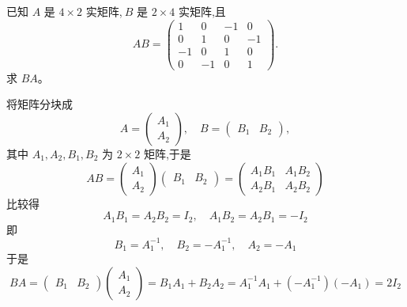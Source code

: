 \begin{questions}
    \question 已知 $A$ 是 $4 \times 2$ 实矩阵,$\ B$ 是 $2 \times 4$ 实矩阵,且
    \[
    AB = \begin{pmatrix}
    1 & 0 & -1 & 0 \\
    0 & 1 & 0 & -1 \\
    -1 & 0 & 1 & 0 \\
    0 & -1 & 0 & 1
    \end{pmatrix}.
    \]
    求 $BA$。
    \begin{solution}
        将矩阵分块成
        \[
        A = \begin{pmatrix} A_1 \\ A_2 \end{pmatrix}, \quad B = \begin{pmatrix} B_1 & B_2 \end{pmatrix},
        \]
        其中 $A_1, A_2, B_1, B_2$ 为 $2 \times 2$ 矩阵,于是
        \[
        AB = \begin{pmatrix} A_1 \\ A_2 \end{pmatrix} \begin{pmatrix} B_1 & B_2 \end{pmatrix} = 
        \begin{pmatrix} A_1B_1 & A_1B_2 \\ A_2B_1 & A_2B_2 \end{pmatrix}
        \]
        比较得
        \[
        A_1B_1 = A_2B_2 = I_2, \quad A_1B_2 = A_2B_1 = -I_2
        \]
        即
        \[
        B_1 = A_1^{-1}, \quad B_2 = -A_1^{-1}, \quad A_2 = -A_1
        \]
        于是
        \[
        BA = \begin{pmatrix} B_1 & B_2 \end{pmatrix} \begin{pmatrix} A_1 \\ A_2 \end{pmatrix} 
        = B_1A_1 + B_2A_2 = A_1^{-1}A_1 + (-A_1^{-1})(-A_1) = 2 I_2
        \]
    \end{solution}


\end{questions}
